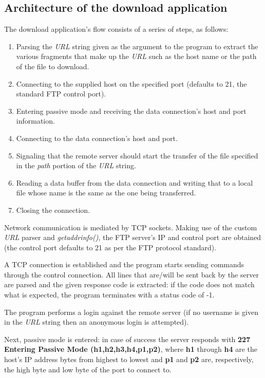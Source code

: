 \documentclass[11pt,a4paper,twocolumn]{article}
\begin{document}
\subsection{Architecture of the download application}

The download application's flow consists of a series of steps, as follows:
\begin{enumerate}
    \item Parsing the \textit{URL} string given as the argument to the program to extract the various fragments that make up the \textit{URL} such as the host name or the path of the file to download.
    \item Connecting to the supplied host on the specified port (defaults to 21, the standard FTP control port).
    \item Entering passive mode and receiving the data connection's host and port information.
    \item Connecting to the data connection's host and port.
    \item Signaling that the remote server should start the transfer of the file specified in the \textit{path} portion of the \textit{URL} string.
    \item Reading a data buffer from the data connection and writing that to a local file whose name is the same as the one being transferred.
    \item Closing the connection.
\end{enumerate}

Network communication is mediated by TCP sockets.
Making use of the custom \textit{URL} parser and \textit{getaddrinfo()}, the FTP server's IP and control port are obtained (the control port defaults to 21 as per the FTP protocol standard).

A TCP connection is established and the program starts sending commands through the control connection. All lines that are/will be sent back by the server are parsed and the given response code is extracted: if the code does not match what is expected, the program terminates with a status code of -1.

The program performs a login against the remote server (if no username is given in the \textit{URL} string then an anonymous login is attempted).

Next, passive mode is entered: in case of success the server responds with \textbf{227 Entering Passive Mode (h1,h2,h3,h4,p1,p2)}, where \textbf{h1} through \textbf{h4} are the host's IP address bytes from highest to lowest and \textbf{p1} and \textbf{p2} are, respectively, the high byte and low byte of the port to connect to.
\end{document}

